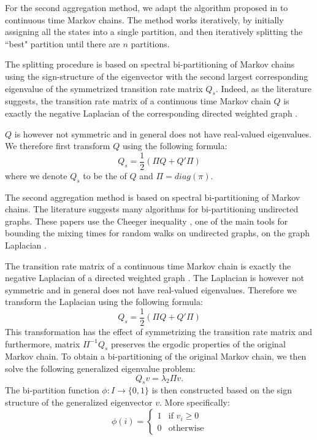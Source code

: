 For the second aggregation method, we adapt the algorithm proposed in  to continuous time Markov chains. The method works iteratively, by initially assigning all the states into a single partition, and then iteratively splitting the ``best" partition until there are $n$ partitions.

The splitting procedure is based on spectral bi-partitioning of Markov chains using the sign-structure of the eigenvector with the second largest corresponding eigenvalue of the symmetrized transition rate matrix $Q_s$. Indeed, as the literature suggests, the transition rate matrix of a continuous time Markov chain $Q$ is exactly the negative Laplacian of the corresponding directed weighted graph \cite{Agaev2005157}.

$Q$ is however not symmetric and in general does not have real-valued eigenvalues. We therefore first transform $Q$ using the following formula:
\begin{equation}
	\nonumber
	Q_s = \frac{1}{2}(\Pi Q + Q' \Pi)
\end{equation}
where we denote $Q_s$ to be the  of $Q$ and $\Pi = diag(\pi)$.


The second aggregation method is based on spectral bi-partitioning of Markov chains. The literature suggests many algorithms for bi-partitioning undirected graphs. These papers use the Cheeger inequality , one of the main tools for bounding the mixing times for random walks on undirected graphs, on the graph Laplacian .

The transition rate matrix of a continuous time Markov chain is exactly the negative Laplacian of a directed weighted graph \cite{Agaev2005157}. The Laplacian is however not symmetric and in general does not have real-valued eigenvalues. Therefore we transform the Laplacian using the following formula:
\begin{equation}
	\nonumber
	Q_s = \frac{1}{2}(\Pi Q + Q' \Pi)
\end{equation}
This transformation has the effect of symmetrizing the transition rate matrix and furthermore, matrix $\Pi^{-1}Q_s$ preserves the ergodic properties of the original Markov chain. To obtain a bi-partitioning of the original Markov chain, we then solve the following generalized eigenvalue problem:
\begin{equation}
	Q_s v = \lambda_2 \Pi v.
\end{equation}
The bi-partition function $\phi: I \rightarrow \{0,1\}$ is then constructed based on the sign structure of the generalized eigenvector $v$. More specifically:
\begin{equation}
	\nonumber
	\phi(i) = 
		\left\{
			\begin{array}{ll}
				1 & \mbox{if } v_i \ge 0 \\
				0 & \mbox{otherwise}
			\end{array}
		\right.
\end{equation}

